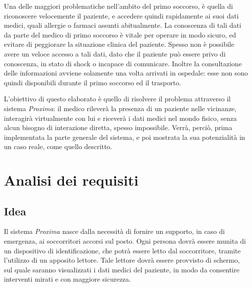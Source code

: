 \documentclass[a4paper,12pt]{report}
\begin{document}
Una delle maggiori problematiche nell'ambito del primo soccorso, è quella di riconoscere velocemente il paziente, e accedere quindi rapidamente ai suoi dati medici, quali allergie o farmaci assunti abitualmente. La conoscenza di tali dati da parte del medico di primo soccorso è vitale per operare in modo sicuro, ed evitare di peggiorare la situazione clinica del paziente. Spesso non è possibile avere un veloce accesso a tali dati, dato che il paziente può essere privo di conoscenza, in stato di shock o incapace di comunicare. Inoltre la consultazione delle informazioni avviene solamente una volta arrivati in ospedale: esse non sono quindi disponibili durante il primo soccorso ed il trasporto.

L'obiettivo di questo elaborato è quello di risolvere il problema attraverso il sistema \emph{Proxima}: il medico rileverà la presenza di un paziente nelle vicinanze, interagirà virtualmente con lui e riceverà i dati medici nel mondo fisico, senza alcun bisogno di interazione diretta, spesso impossibile. Verrà, perciò, prima implementata la parte generale del sistema, e poi mostrata la sua potenzialità in un caso reale, come quello descritto.  

\chapter{Analisi dei requisiti} \label{requirements}
\section{Idea}
Il sistema \emph{Proxima} nasce dalla necessità di fornire un supporto, in caso di emergenza, ai soccorritori accorsi sul posto. Ogni persona dovrà essere munita di un dispositivo di identificazione, che potrà essere letto dal soccorritore, tramite l'utilizzo di un apposito lettore. Tale lettore dovrà essere provvisto di schermo, sul quale saranno visualizzati i dati medici del paziente, in modo da consentire interventi mirati e con maggiore sicurezza. 
\end{document}
